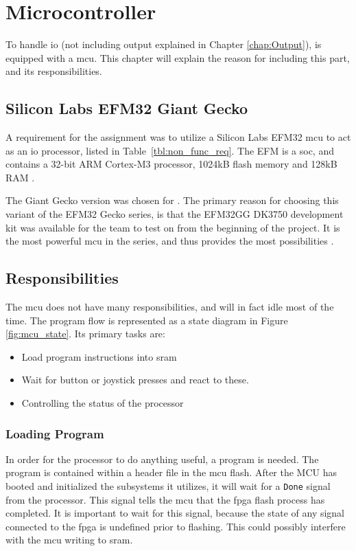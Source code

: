 \chapter{Microcontroller}
\label{ch:mcu}

To handle \gls{io} (not including output explained in Chapter \ref{chap:Output}), \vthreek is equipped with a \gls{mcu}.
This chapter will explain the reason for including this part, and its responsibilities.

\section{Silicon Labs EFM32 Giant Gecko}
A requirement for the assignment was to utilize a Silicon Labs EFM32 \gls{mcu} to act as an \gls{io} processor, listed in Table~\ref{tbl:non_func_req}.
The EFM is a \gls{soc}, and contains a 32-bit ARM Cortex-M3 processor, 1024kB flash memory and 128kB RAM \cite{efm32referencemanual}.

The Giant Gecko version was chosen for \vthreek.
The primary reason for choosing this variant of the EFM32 Gecko series, is that the EFM32GG DK3750 development kit was available for the team to test on from the beginning of the project.
It is the most powerful \gls{mcu} in the series, and thus provides the most possibilities \cite{efm32}.

\section{Responsibilities}
The \gls{mcu} does not have many responsibilities, and will in fact idle most of the time. The program flow is represented as a state diagram in Figure \ref{fig:mcu_state}.
Its primary tasks are:
\begin{itemize}
\item Load program instructions into \gls{sram}
\item Wait for button or joystick presses and react to these.
\item Controlling the status of the processor
\end{itemize}

\subsection{Loading Program}
In order for the processor to do anything useful, a program is needed.
The program is contained within a header file in the \gls{mcu} flash.
After the MCU has booted and initialized the subsystems it utilizes, it will wait for a \texttt{Done} signal from the processor.
This signal tells the \gls{mcu} that the \gls{fpga} flash process has completed.
It is important to wait for this signal, because the state of any signal connected to the \gls{fpga} is undefined prior to flashing.
This could possibly interfere with the \gls{mcu} writing to \gls{sram}.

